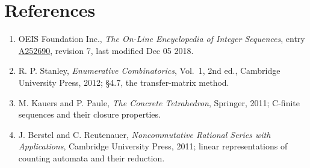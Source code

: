 \documentclass[11pt]{article}
\theoremstyle{definition}
\begin{document}
\section{References}

\begin{enumerate}

\item OEIS Foundation Inc., \emph{The On-Line Encyclopedia of Integer Sequences}, entry \href{https://oeis.org/A252690}{A252690}, revision 7, last modified Dec 05 2018.

\item R. P. Stanley, \emph{Enumerative Combinatorics}, Vol.~1, 2nd ed., Cambridge University Press, 2012; \S4.7, the transfer-matrix method.

\item M. Kauers and P. Paule, \emph{The Concrete Tetrahedron}, Springer, 2011; C-finite sequences and their closure properties.

\item J. Berstel and C. Reutenauer, \emph{Noncommutative Rational Series with Applications}, Cambridge University Press, 2011; linear representations of counting automata and their reduction.

\end{enumerate}
\end{document}
